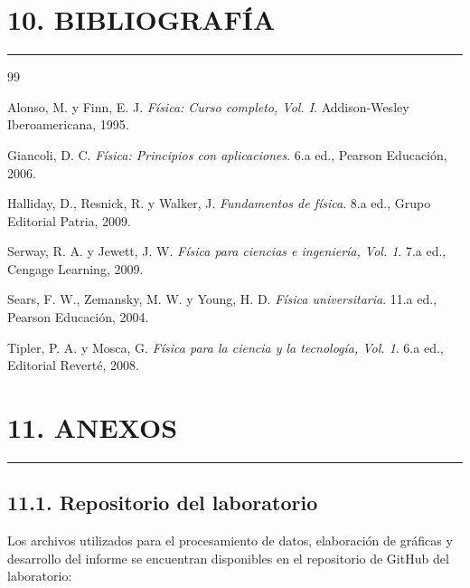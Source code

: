 \documentclass[11pt,a4paper]{article}
\newcommand{\sectionline}{%
    \vspace{-0.6em}
    \noindent\rule{\textwidth}{0.5pt}
    \vspace{0.5em}
}
\begin{document}

\newpage
\section*{10. BIBLIOGRAFÍA}
\sectionline

\begin{thebibliography}{99}

Alonso, M. y Finn, E. J.
\textit{Física: Curso completo, Vol. I}.
Addison-Wesley Iberoamericana, 1995.

Giancoli, D. C.
\textit{Física: Principios con aplicaciones}.
6.a ed., Pearson Educación, 2006.

Halliday, D., Resnick, R. y Walker, J.
\textit{Fundamentos de física}.
8.a ed., Grupo Editorial Patria, 2009.

Serway, R. A. y Jewett, J. W.
\textit{Física para ciencias e ingeniería, Vol. 1}.
7.a ed., Cengage Learning, 2009.

Sears, F. W., Zemansky, M. W. y Young, H. D.
\textit{Física universitaria}.
11.a ed., Pearson Educación, 2004.

Tipler, P. A. y Mosca, G.
\textit{Física para la ciencia y la tecnología, Vol. 1}.
6.a ed., Editorial Reverté, 2008.

\end{thebibliography}


\newpage
\section*{11. ANEXOS}
\sectionline

\subsection*{11.1. Repositorio del laboratorio}

Los archivos utilizados para el procesamiento de datos, elaboración de
gráficas y desarrollo del informe se encuentran disponibles en el
repositorio de GitHub del laboratorio:
\end{document}
